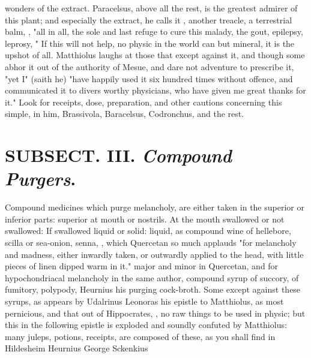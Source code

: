 {wonders of the extract. Paracelsus, above all the rest, is the greatest admirer of this plant; and especially the extract, he calls it , another treacle, a terrestrial balm, , "all in all, the sole and last refuge to cure this malady, the gout, epilepsy, leprosy, \etc{}" If this will not help, no physic in the world can but mineral, it is the upshot of all. Matthiolus laughs at those that except against it, and though some abhor it out of the authority of Mesue, and dare not adventure to prescribe it, "yet I" (saith he) "have happily used it six hundred times without offence, and communicated it to divers worthy physicians, who have given me great thanks for it." Look for receipts, dose, preparation, and other cautions concerning this simple, in him, Brassivola, Baracelsus, Codronchus, and the rest.


\section{ SUBSECT. III. \emph{Compound Purgers}.}


Compound medicines which purge melancholy, are either taken in the superior or inferior parts: superior at mouth or nostrils. At the mouth swallowed or not swallowed: If swallowed liquid or solid: liquid, as compound wine of hellebore, scilla or sea-onion, senna, , which Quercetan so much applauds "for melancholy and madness, either inwardly taken, or outwardly applied to the head, with little pieces of linen dipped warm in it."  major and minor in Quercetan, and  for hypochondriacal melancholy in the same author, compound syrup of succory, of fumitory, polypody, \etc{} Heurnius his purging cock-broth. Some except against these syrups, as appears by Udalrinus Leonoras his epistle to Matthiolus, as most pernicious, and that out of Hippocrates, , no raw things to be used in physic; but this in the following epistle is exploded and soundly confuted by Matthiolus: many juleps, potions, receipts, are composed of these, as you shall find in Hildesheim  Heurnius  George Sckenkius  \etc{}

}
